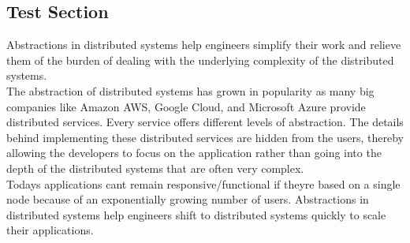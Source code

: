 \documentclass{article}
\begin{document}
\subsection{Test Section}

Abstractions in distributed systems help engineers simplify their work and relieve them of the burden of dealing with the underlying complexity of the distributed systems. \\
The abstraction of distributed systems has grown in popularity as many big companies like Amazon AWS, Google Cloud, and Microsoft Azure provide distributed services. Every
service offers different levels of abstraction. The
details behind implementing these distributed services are hidden from the users, thereby allowing the developers to focus on the application rather than going into the depth of the distributed systems that are often very complex. \\
Today\textquotesingle s applications can\textquotesingle t remain responsive/functional if they\textquotesingle re based on a single node because of an exponentially growing number of users. Abstractions
in distributed systems help engineers shift to distributed systems quickly to scale their applications.
\end{document}
